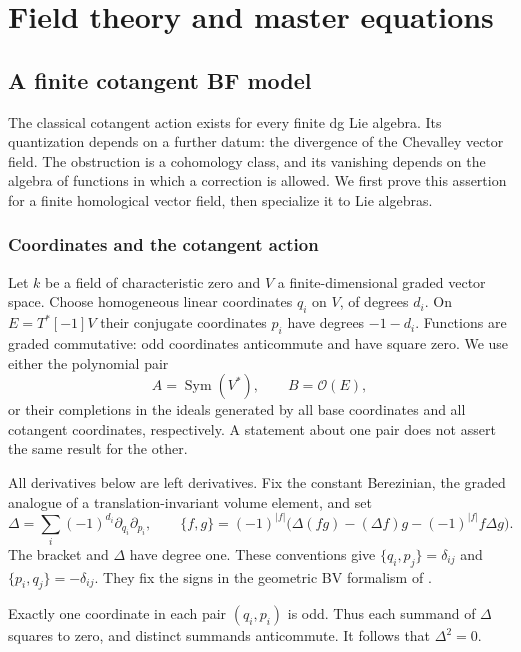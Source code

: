 \part{Field theory and master equations}

\chapter{A finite cotangent BF model}\label{cbc:finite-bv}
The classical cotangent action exists for every finite dg Lie algebra.
Its quantization depends on a further datum: the divergence of the
Chevalley vector field.  The obstruction is a cohomology class, and its
vanishing depends on the algebra of functions in which a correction is
allowed.  We first prove this assertion for a finite homological vector
field, then specialize it to Lie algebras.

\section{Coordinates and the cotangent action}
Let $k$ be a field of characteristic zero and $V$ a finite-dimensional
graded vector space.  Choose homogeneous linear coordinates $q_i$ on
$V$, of degrees $d_i$.  On $E=T^*[-1]V$ their conjugate coordinates $p_i$
have degrees $-1-d_i$.  Functions are graded commutative: odd coordinates
anticommute and have square zero.  We use either the polynomial pair
\[
 A=\operatorname{Sym}(V^*),\qquad B=\mathcal O(E),
\]
or their completions in the ideals generated by all base coordinates
and all cotangent coordinates, respectively.  A statement about one
pair does not assert the same result for the other.

All derivatives below are left derivatives.  Fix the constant
Berezinian, the graded analogue of a translation-invariant volume
element, and set
\begin{equation}\label{cbc:bv:laplacian}
 \Delta=\sum_i(-1)^{d_i}\partial_{q_i}\partial_{p_i},\qquad
 \{f,g\}=(-1)^{|f|}
 \bigl(\Delta(fg)-(\Delta f)g-(-1)^{|f|}f\Delta g\bigr).
\end{equation}
The bracket and $\Delta$ have degree one.  These conventions give
$\{q_i,p_j\}=\delta_{ij}$ and $\{p_i,q_j\}=-\delta_{ij}$.
They fix the signs in the geometric BV formalism of
\cite{SchwarzBV1993,MnevBV2016}.

Exactly one coordinate in each pair $(q_i,p_i)$ is odd.  Thus each
summand of $\Delta$ squares to zero, and distinct summands anticommute.
It follows that $\Delta^2=0$.

